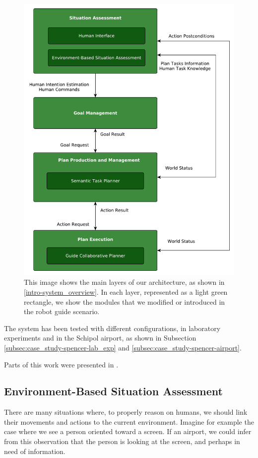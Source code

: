 \begin{figure}[ht!]
	\centering
	\includegraphics[scale=0.45]{img/case_study/spencer/architecture.pdf}
	\caption{This image shows the main layers of our architecture, as shown in \ref{intro-system_overview}. In each layer, represented as a light green rectangle, we show the modules that we modified or introduced in the robot guide scenario.}
	\label{fig:case_study-spencer-architecture}
\end{figure}

The system has been tested with different configurations, in laboratory experiments and in the Schipol airport, as shown in Subsection \ref{subsec:case_study-spencer-lab_exp} and \ref{subsec:case_study-spencer-airport}.

Parts of this work were presented in \cite{fiore2015adaptive}.

\subsection{Environment-Based Situation Assessment}
\label{subsec:case_study-spencer-intention}
There are many situations where, to properly reason on humans, we should link their movements and actions to the current environment. Imagine for example the case where we see a person oriented toward a screen. If an airport, we could infer from this observation that the person is looking at the screen, and perhaps in need of information. 


